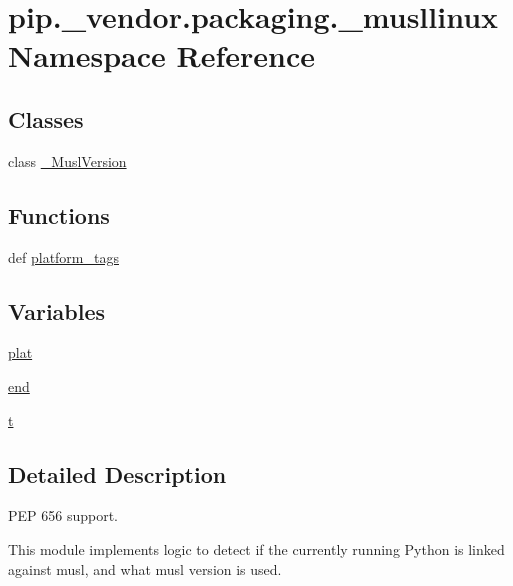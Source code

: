 \hypertarget{namespacepip_1_1__vendor_1_1packaging_1_1__musllinux}{}\section{pip.\+\_\+vendor.\+packaging.\+\_\+musllinux Namespace Reference}
\label{namespacepip_1_1__vendor_1_1packaging_1_1__musllinux}
\subsection*{Classes}
\begin{DoxyCompactItemize}
\item 
class \hyperlink{classpip_1_1__vendor_1_1packaging_1_1__musllinux_1_1__MuslVersion}{\+\_\+\+Musl\+Version}
\end{DoxyCompactItemize}
\subsection*{Functions}
\begin{DoxyCompactItemize}
\item 
def \hyperlink{namespacepip_1_1__vendor_1_1packaging_1_1__musllinux_ad819c13e240d73ef2c8b7f20643a43cc}{platform\+\_\+tags}
\end{DoxyCompactItemize}
\subsection*{Variables}
\begin{DoxyCompactItemize}
\item 
\hyperlink{namespacepip_1_1__vendor_1_1packaging_1_1__musllinux_ac558dc6765cdbcdac70233f8d72228e5}{plat}
\item 
\hyperlink{namespacepip_1_1__vendor_1_1packaging_1_1__musllinux_a9706ca1b273433216081c429368373f3}{end}
\item 
\hyperlink{namespacepip_1_1__vendor_1_1packaging_1_1__musllinux_a62fb42b72b9b98c660d1bd4beafbf2c0}{t}
\end{DoxyCompactItemize}


\subsection{Detailed Description}
\begin{DoxyVerb}PEP 656 support.

This module implements logic to detect if the currently running Python is
linked against musl, and what musl version is used.
\end{DoxyVerb}
 

